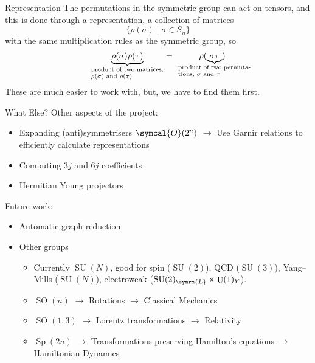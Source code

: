 \documentclass{beamer}
\newcommand{\define}[1]{\alert{#1}}
\DeclareMathOperator{\specialUnitary}{SU}
\DeclareMathOperator{\unitary}{U}
\DeclareMathOperator{\specialOrthogonal}{SO}
\DeclareMathOperator{\symplectic}{Sp}
\begin{document}
    \begin{frame}{Representation}
        The permutations in the symmetric group can act on tensors, and this is done through a \define{representation}, a collection of matrices
        \begin{equation*}
            \{\rho(\sigma) \mid \sigma \in S_n\}
        \end{equation*}
        with the same multiplication rules as the symmetric group, so
        \begin{equation*}
            \underbrace{\rho(\sigma)\rho(\tau)}_{\parbox{3cm}{\scriptsize product of two matrices, \(\rho(\sigma)\) and \(\rho(\tau)\)}} = \hspace{1cm} \rho(\underbrace{\sigma\tau}_{\mathclap{\parbox{3cm}{\scriptsize product of two permutations, \(\sigma\) and \(\tau\)}}})
        \end{equation*}
        These are much easier to work with, but, we have to find them first.
    \end{frame}
    
    \begin{frame}{What Else?}
        Other aspects of the project:
        \begin{itemize}
            \item\pause Expanding (anti)symmetrisers \(\symcal{O}(2^n)\) \(\to\) Use Garnir relations to efficiently calculate representations
            \item\pause Computing \(3j\) and \(6j\) coefficients
            \item\pause Hermitian Young projectors
        \end{itemize}
        \pause
        Future work:
        \begin{itemize}
            \item Automatic graph reduction
            \item\pause Other groups
            \begin{itemize}
                \item\pause Currently \(\specialUnitary(N)\), good for spin (\(\specialUnitary(2)\)), QCD (\(\specialUnitary(3)\)), Yang--Mills (\(\specialUnitary(N)\)), electroweak (\(\specialUnitary(2)_{\symrm{L}} \times \unitary(1)_{Y}\)).
                \item\pause \(\specialOrthogonal(n)\) \(\to\) Rotations \(\to\) Classical Mechanics
                \item\pause \(\specialOrthogonal(1, 3)\) \(\to\) Lorentz transformations \(\to\) Relativity
                \item\pause \(\symplectic(2n)\) \(\to\) Transformations preserving Hamilton's equations \(\to\) Hamiltonian Dynamics
            \end{itemize}
        \end{itemize}
    \end{frame}
    
\end{document}
